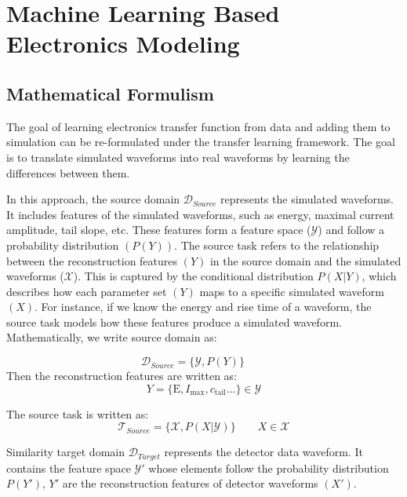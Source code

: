 \section{Machine Learning Based Electronics Modeling}
\subsection{Mathematical Formulism}
The goal of learning electronics transfer function from data and adding them to simulation can be re-formulated under the transfer learning framework. The goal is to translate simulated waveforms into real waveforms by learning the differences between them.

In this approach, the source domain $\mathcal{D}_{Source}$ represents the simulated waveforms. It includes features of the simulated waveforms, such as energy, maximal current amplitude, tail slope, etc. These features form a feature space ($\mathcal{Y}$) and follow a probability distribution $(P(Y))$. The source task refers to the relationship between the reconstruction features $(Y)$ in the source domain and the simulated waveforms ($\mathcal{X}$). This is captured by the conditional distribution $P(X|Y)$, which describes how each parameter set $(Y)$ maps to a specific simulated waveform $(X)$. For instance, if we know the energy and rise time of a waveform, the source task models how these features produce a simulated waveform. Mathematically, we write source domain as:

\begin{equation}
    \mathcal{D}_{Source}=\{\mathcal{Y},P(Y)\}\qquad 
    \label{eqn:source_domain}
\end{equation}
Then the reconstruction features are written as:
 \begin{equation}
     Y=\{\mathrm{E},I_{\mathrm{max}},c_{\mathrm{tail}}...\}\in \mathcal{Y}
 \end{equation}

The source task is written as:
\begin{equation}
    \mathcal{T}_{Source}=\{\mathcal{X},P(X|\mathcal{Y})\} \qquad X\in \mathcal{X}
    \label{eqn:source_task}
\end{equation}


Similarity target domain $\mathcal{D}_{Target}$ represents the detector data waveform. It contains the feature space $\mathcal{Y'}$ whose elements follow the probability distribution $P(Y')$, $Y'$ are the reconstruction features of detector waveforms $(X')$.

